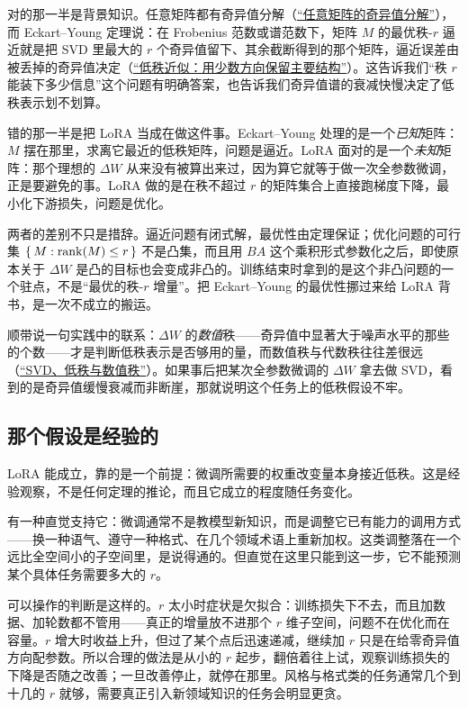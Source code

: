对的那一半是背景知识。任意矩阵都有奇异值分解（\hyperref[sec:03-Linear-Algebra/07-SVD-and-Data-Applications/01]{``任意矩阵的奇异值分解''}），而 Eckart--Young 定理说：在 Frobenius 范数或谱范数下，矩阵 \(M\) 的最优秩-\(r\) 逼近就是把 SVD 里最大的 \(r\) 个奇异值留下、其余截断得到的那个矩阵，逼近误差由被丢掉的奇异值决定（\hyperref[sec:03-Linear-Algebra/07-SVD-and-Data-Applications/03]{``低秩近似：用少数方向保留主要结构''}）。这告诉我们``秩 \(r\) 能装下多少信息''这个问题有明确答案，也告诉我们奇异值谱的衰减快慢决定了低秩表示划不划算。

错的那一半是把 LoRA 当成在做这件事。Eckart--Young 处理的是一个\emph{已知}矩阵：\(M\) 摆在那里，求离它最近的低秩矩阵，问题是逼近。LoRA 面对的是一个\emph{未知}矩阵：那个理想的 \(\Delta W\) 从来没有被算出来过，因为算它就等于做一次全参数微调，正是要避免的事。LoRA 做的是在秩不超过 \(r\) 的矩阵集合上直接跑梯度下降，最小化下游损失，问题是优化。

两者的差别不只是措辞。逼近问题有闭式解，最优性由定理保证；优化问题的可行集 \(\{\,M : \operatorname{rank}(M) \le r\,\}\) 不是凸集，而且用 \(BA\) 这个乘积形式参数化之后，即使原本关于 \(\Delta W\) 是凸的目标也会变成非凸的。训练结束时拿到的是这个非凸问题的一个驻点，不是``最优的秩-\(r\) 增量''。把 Eckart--Young 的最优性挪过来给 LoRA 背书，是一次不成立的搬运。

顺带说一句实践中的联系：\(\Delta W\) 的\emph{数值}秩——奇异值中显著大于噪声水平的那些的个数——才是判断低秩表示是否够用的量，而数值秩与代数秩往往差很远（\hyperref[sec:08-Numerical-Analysis/05-Numerical-Linear-Algebra/06]{``SVD、低秩与数值秩''}）。如果事后把某次全参数微调的 \(\Delta W\) 拿去做 SVD，看到的是奇异值缓慢衰减而非断崖，那就说明这个任务上的低秩假设不牢。

\subsection{那个假设是经验的}

LoRA 能成立，靠的是一个前提：微调所需要的权重改变量本身接近低秩。这是经验观察，不是任何定理的推论，而且它成立的程度随任务变化。

有一种直觉支持它：微调通常不是教模型新知识，而是调整它已有能力的调用方式——换一种语气、遵守一种格式、在几个领域术语上重新加权。这类调整落在一个远比全空间小的子空间里，是说得通的。但直觉在这里只能到这一步，它不能预测某个具体任务需要多大的 \(r\)。

可以操作的判断是这样的。\(r\) 太小时症状是欠拟合：训练损失下不去，而且加数据、加轮数都不管用——真正的增量放不进那个 \(r\) 维子空间，问题不在优化而在容量。\(r\) 增大时收益上升，但过了某个点后迅速递减，继续加 \(r\) 只是在给零奇异值方向配参数。所以合理的做法是从小的 \(r\) 起步，翻倍着往上试，观察训练损失的下降是否随之改善；一旦改善停止，就停在那里。风格与格式类的任务通常几个到十几的 \(r\) 就够，需要真正引入新领域知识的任务会明显更贪。

